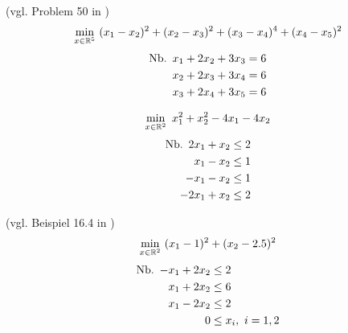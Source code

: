 \begin{testproblem}
(vgl. Problem 50 in \cite[S.~73]{hock})
\begin{equation}
\min_{x\in\mathbb{R}^5}\ (x_1-x_2)^2 + (x_2-x_3)^2 + (x_3-x_4)^4 + (x_4-x_5)^2 
\end{equation}
\begin{equation*}
\begin{split}
\nb x_1 + 2 x_2 + 3 x_3 & = 6 \\
x_2 + 2 x_3 + 3 x_4 & = 6 \\
x_3 + 2 x_4 + 3 x_5 & = 6 \\
\end{split}
\end{equation*}
\end{testproblem}

\begin{testproblem}
\begin{equation}
\min_{x\in\mathbb{R}^2}\ x_1^2 + x_2^2 - 4 x_1 - 4 x_2
\end{equation}
\begin{equation*}
\begin{split}
\nb 2 x_1 + x_2 & \leq 2 \\
x_1 - x_2 & \leq 1 \\
-x_1 - x_2 & \leq 1 \\
-2 x_1 + x_2 & \leq 2 \\
\end{split}
\end{equation*}
\end{testproblem}

\begin{testproblem}
(vgl. Beispiel 16.4 in \cite[S.~475]{nocedal})
\begin{equation}
\min_{x\in\mathbb{R}^2}\ (x_1 - 1)^2 + (x_2 - 2.5)^2
\end{equation}
\begin{equation*}
\begin{split}
\nb -x_1 + 2 x_2 & \leq 2 \\
x_1 + 2 x_2 & \leq 6 \\
x_1 - 2 x_2 & \leq 2 \\
0 & \leq x_i,\ i = 1,2 \\
\end{split}
\end{equation*}
\end{testproblem}

